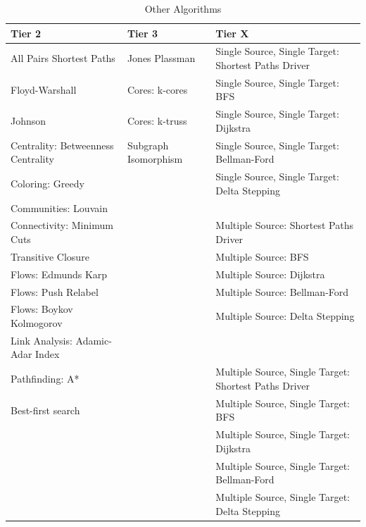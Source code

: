 \begin{table}[ht]
\begin{center}
{\begin{tabular}{l|l|l}
\hline
    \textbf{Tier 2} & \textbf{Tier 3} & \textbf{Tier X} \\
\hline
    All Pairs Shortest Paths & Jones Plassman & Single Source, Single Target: Shortest Paths Driver\\
    Floyd-Warshall & Cores: k-cores & Single Source, Single Target: BFS \\
    Johnson & Cores: k-truss & Single Source, Single Target: Dijkstra \\
    Centrality: Betweenness Centrality & Subgraph Isomorphism & Single Source, Single Target: Bellman-Ford \\
    Coloring: Greedy & & Single Source, Single Target: Delta Stepping \\
    Communities: Louvain & &  \\
    Connectivity: Minimum Cuts & & Multiple Source: Shortest Paths Driver \\
    Transitive Closure & & Multiple Source: BFS \\
    Flows: Edmunds Karp & & Multiple Source: Dijkstra \\
    Flows: Push Relabel & & Multiple Source: Bellman-Ford \\
    Flows: Boykov Kolmogorov & & Multiple Source: Delta Stepping \\
    Link Analysis: Adamic-Adar Index & &  \\
    Pathfinding: A* & & Multiple Source, Single Target: Shortest Paths Driver\\
    Best-first search & & Multiple Source, Single Target: BFS \\
    & & Multiple Source, Single Target: Dijkstra \\
    & & Multiple Source, Single Target: Bellman-Ford \\
    & & Multiple Source, Single Target: Delta Stepping \\
\hline
\end{tabular}}
\caption{Other Algorithms}
\label{tab:other_algorithms}
\end{center}
\end{table}


